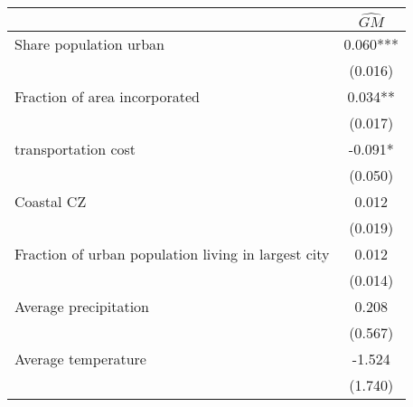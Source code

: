  \begin{tabular}{l*{1}{c}} \toprule
                &\multicolumn{1}{c}{$\widehat{GM}$}\\
\midrule
Share population urban&    0.060***\\
                &  (0.016)   \\
\addlinespace
Fraction of area incorporated&    0.034** \\
                &  (0.017)   \\
\addlinespace
1920 transportation cost&   -0.091*  \\
                &  (0.050)   \\
\addlinespace
Coastal CZ      &    0.012   \\
                &  (0.019)   \\
\addlinespace
Fraction of urban population living in largest city&    0.012   \\
                &  (0.014)   \\
\addlinespace
Average precipitation&    0.208   \\
                &  (0.567)   \\
\addlinespace
Average temperature&   -1.524   \\
                &  (1.740)   \\
       \bottomrule \end{tabular}
